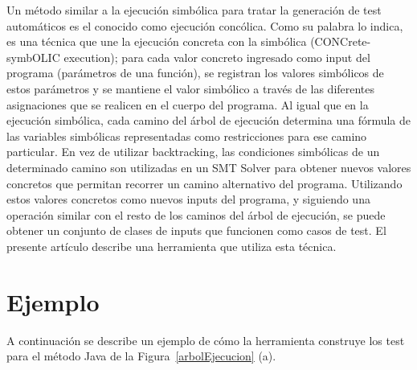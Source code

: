 \documentclass{llncs}
\begin{document}
Un método similar a la ejecución simbólica para tratar la generación de test automáticos es el conocido como ejecución concólica. Como su palabra lo indica, es una técnica que une la
ejecución concreta con la simbólica (CONCrete-symbOLIC execution); para cada valor concreto ingresado como input del programa (parámetros de una función), se registran los valores
simbólicos de estos parámetros y se mantiene el valor simbólico a través de las diferentes asignaciones que se realicen en el cuerpo del programa. Al igual que en la ejecución
simbólica, cada camino del árbol de ejecución determina una fórmula de las variables simbólicas representadas como restricciones para ese camino particular. En vez de utilizar backtracking,
las condiciones simbólicas de un determinado camino son utilizadas en un SMT Solver para obtener nuevos valores concretos que permitan recorrer un camino alternativo del programa.
Utilizando estos valores concretos como nuevos inputs del programa, y siguiendo una operación similar con el resto de los caminos del árbol de ejecución, se puede obtener un conjunto
de clases de inputs que funcionen como casos de test. El presente artículo describe una herramienta que utiliza esta técnica.


\section{Ejemplo}
A continuación se describe un ejemplo de cómo la herramienta construye los test para el método Java de la Figura~\ref{arbolEjecucion} (a).
\end{document}
